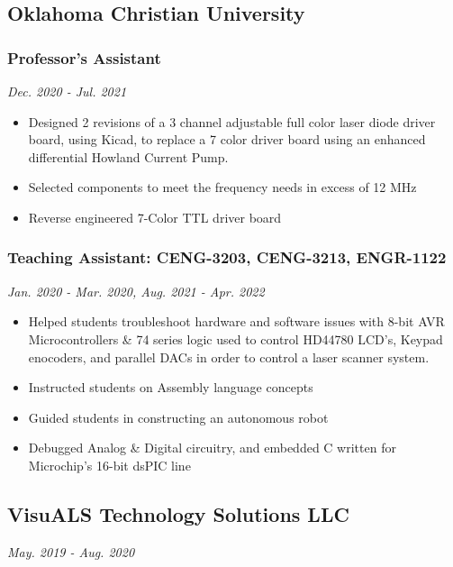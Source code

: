 \documentclass{article}
\begin{document}
\begin{spacing}{.5}
	\subsection{Oklahoma Christian University}
		\subsubsection{\large{Professor's Assistant}} \hfill \small{\textsl{Dec. 2020 - Jul. 2021}}
			\begin{itemize}[label=--,itemsep=-.65ex]
				\item \large{Designed 2 revisions of a 3 channel adjustable full color laser diode driver board, using Kicad, to replace a 7 color driver board using an enhanced differential Howland Current Pump.}
				\item \large{Selected components to meet the frequency needs in excess of 12 MHz}
				\item \large{Reverse engineered 7-Color TTL driver board}
			\end{itemize}
		\subsubsection{\large{Teaching Assistant: CENG-3203, CENG-3213, ENGR-1122}} \hfill \small{\textsl{Jan. 2020 - Mar. 2020, Aug. 2021 - Apr. 2022}}
			\begin{itemize}[label=--,itemsep=-.65ex]
				\item \large{Helped students troubleshoot hardware and software issues with 8-bit AVR Microcontrollers \& 74 series logic used to control HD44780 LCD's, Keypad enocoders, and parallel DACs in order to control a laser scanner system.}
				\item \large{Instructed students on Assembly language concepts}
				\item \large{Guided students in constructing an autonomous robot}
				\item \large{Debugged Analog \& Digital circuitry, and embedded C written for Microchip's 16-bit dsPIC line}
			\end{itemize}
	\subsection{VisuALS Technology Solutions LLC} \hfill \small{\textsl{May. 2019 - Aug. 2020}}

\end{spacing}
\end{document}
